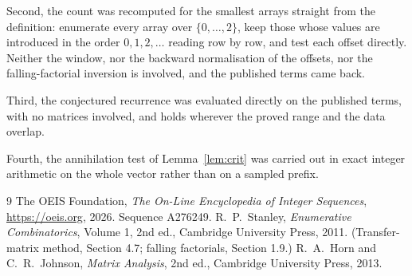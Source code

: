 \documentclass[11pt,a4paper]{article}
\theoremstyle{plain}
\theoremstyle{definition}
\begin{document}
Second, the count was recomputed for the smallest arrays straight from the definition:
enumerate every array over $\{0,\dots,2\}$, keep those whose values are introduced in the
order $0,1,2,\dots$ reading row by row, and test each offset directly. Neither the window, nor
the backward normalisation of the offsets, nor the falling-factorial inversion is involved, and
the published terms came back.

Third, the conjectured recurrence was evaluated directly on the published terms, with no
matrices involved, and holds wherever the proved range and the data overlap.

Fourth, the annihilation test of Lemma~\ref{lem:crit} was carried out in exact integer
arithmetic on the whole vector rather than on a sampled prefix.

\begin{thebibliography}{9}
 The OEIS Foundation, \emph{The On-Line Encyclopedia of Integer
Sequences}, \url{https://oeis.org}, 2026. Sequence A276249.
 R.~P.~Stanley, \emph{Enumerative Combinatorics}, Volume 1, 2nd ed.,
Cambridge University Press, 2011. (Transfer-matrix method, Section 4.7; falling factorials,
Section 1.9.)
 R.~A.~Horn and C.~R.~Johnson, \emph{Matrix Analysis}, 2nd ed., Cambridge
University Press, 2013.
\end{thebibliography}
\end{document}
